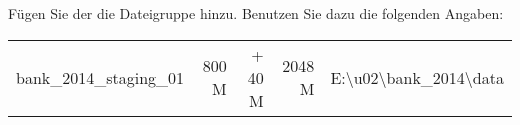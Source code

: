 \item Fügen Sie der  die Dateigruppe
 hinzu. Benutzen Sie dazu die folgenden Angaben:
\begin{center}
  \begin{small}
    \tablehead{
    }
    \tabletail {
    }
    \tablelasttail {
    }
    \begin{supertabular}{lrrrl}
      bank\_2014\_staging\_01 & 800 M &  + 40 M & 2048 M &
      E:\textbackslash u02\textbackslash bank\_2014\textbackslash data \\
    \end{supertabular}
  \end{small}
\end{center}
